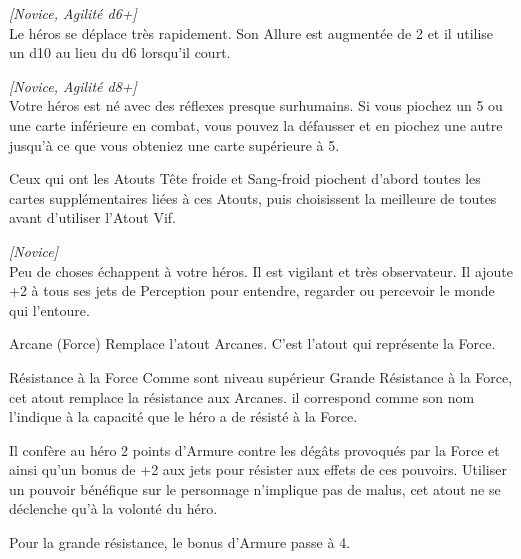 \begin{description}[align=left]
    \item [Véloce]
    	\emph{[Novice, Agilité d6+]}\\
        Le héros se déplace très rapidement. Son Allure est augmentée de 2 et il utilise un d10 au lieu du d6 lorsqu’il court.

    \item [Vif]
    	\emph{[Novice, Agilité d8+]}\\
        Votre héros est né avec des réflexes presque surhumains. Si vous piochez un 5 ou une carte inférieure en combat, vous pouvez la défausser et en piochez une autre jusqu’à ce que vous obteniez une carte supérieure à 5. 

        Ceux qui ont les Atouts Tête froide et Sang-froid piochent d’abord toutes les cartes supplémentaires liées à ces Atouts, puis choisissent la meilleure de toutes avant d’utiliser l’Atout Vif.

    \item [Vigilant]
    	\emph{[Novice]}\\
        Peu de choses échappent à votre héros. Il est vigilant et très observateur. Il ajoute +2 à tous ses jets de Perception pour entendre, regarder ou percevoir le monde qui l’entoure.
\end{description}

\begin{paperbox}{Arcane (Force)}
    Remplace l’atout Arcanes. C’est l’atout qui représente la Force.
\end{paperbox}

\begin{paperbox}{Résistance à la Force}
    Comme sont niveau supérieur Grande Résistance à la Force, cet atout remplace la résistance aux Arcanes. il correspond comme son nom l’indique à la capacité que le héro a de résisté à la Force.

    Il confère au héro 2 points d’Armure contre les dégâts provoqués par la Force et ainsi qu’un bonus de +2 aux jets pour résister aux effets de ces pouvoirs. Utiliser un pouvoir bénéfique sur le personnage n’implique pas de malus, cet atout ne se déclenche qu’à la volonté du héro.

    Pour la grande résistance, le bonus d’Armure passe à 4.
\end{paperbox}

\newpage
